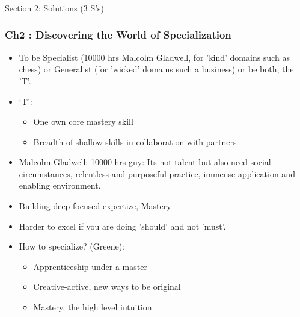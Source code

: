 \begin{frame}[fragile]\frametitle{}
\begin{center}
{\Large Section 2: Solutions (3 S's)}
\end{center}
\end{frame}
\begin{frame}[fragile]\frametitle{Ch2 : Discovering the World of Specialization}

\begin{itemize}
\item To be Specialist (10000 hrs Malcolm Gladwell, for 'kind' domains such as chess) or Generalist (for 'wicked' domains such a business) or be both, the 'T'.
\item `T': 
	\begin{itemize}
	\item One own core mastery skill
	\item Breadth of shallow skills in collaboration with partners
	\end{itemize}
\item Malcolm Gladwell: 10000 hrs guy: Its not talent but also need  social circumstances, relentless and purposeful practice, immense application and enabling environment.
\item Building deep focused expertize, Mastery
\item Harder to excel if you are doing 'should' and not 'must'.
\item How to specialize? (Greene):
	\begin{itemize}
	\item Apprenticeship under a master
	\item Creative-active, new ways to be original
	\item Mastery, the high level intuition.
	\end{itemize}
\end{itemize}

\end{frame}

